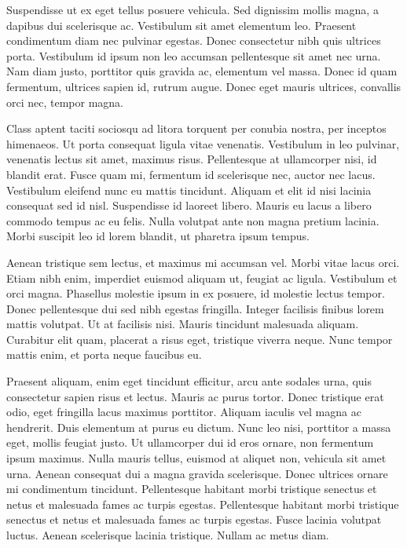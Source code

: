 Suspendisse ut ex eget tellus posuere vehicula. Sed dignissim mollis magna, a dapibus dui scelerisque ac. Vestibulum sit amet elementum leo. Praesent condimentum diam nec pulvinar egestas. Donec consectetur nibh quis ultrices porta. Vestibulum id ipsum non leo accumsan pellentesque sit amet nec urna. Nam diam justo, porttitor quis gravida ac, elementum vel massa. Donec id quam fermentum, ultrices sapien id, rutrum augue. Donec eget mauris ultrices, convallis orci nec, tempor magna.

Class aptent taciti sociosqu ad litora torquent per conubia nostra, per inceptos himenaeos. Ut porta consequat ligula vitae venenatis. Vestibulum in leo pulvinar, venenatis lectus sit amet, maximus risus. Pellentesque at ullamcorper nisi, id blandit erat. Fusce quam mi, fermentum id scelerisque nec, auctor nec lacus. Vestibulum eleifend nunc eu mattis tincidunt. Aliquam et elit id nisi lacinia consequat sed id nisl. Suspendisse id laoreet libero. Mauris eu lacus a libero commodo tempus ac eu felis. Nulla volutpat ante non magna pretium lacinia. Morbi suscipit leo id lorem blandit, ut pharetra ipsum tempus.

Aenean tristique sem lectus, et maximus mi accumsan vel. Morbi vitae lacus orci. Etiam nibh enim, imperdiet euismod aliquam ut, feugiat ac ligula. Vestibulum et orci magna. Phasellus molestie ipsum in ex posuere, id molestie lectus tempor. Donec pellentesque dui sed nibh egestas fringilla. Integer facilisis finibus lorem mattis volutpat. Ut at facilisis nisi. Mauris tincidunt malesuada aliquam. Curabitur elit quam, placerat a risus eget, tristique viverra neque. Nunc tempor mattis enim, et porta neque faucibus eu.

Praesent aliquam, enim eget tincidunt efficitur, arcu ante sodales urna, quis consectetur sapien risus et lectus. Mauris ac purus tortor. Donec tristique erat odio, eget fringilla lacus maximus porttitor. Aliquam iaculis vel magna ac hendrerit. Duis elementum at purus eu dictum. Nunc leo nisi, porttitor a massa eget, mollis feugiat justo. Ut ullamcorper dui id eros ornare, non fermentum ipsum maximus. Nulla mauris tellus, euismod at aliquet non, vehicula sit amet urna. Aenean consequat dui a magna gravida scelerisque. Donec ultrices ornare mi condimentum tincidunt. Pellentesque habitant morbi tristique senectus et netus et malesuada fames ac turpis egestas. Pellentesque habitant morbi tristique senectus et netus et malesuada fames ac turpis egestas. Fusce lacinia volutpat luctus. Aenean scelerisque lacinia tristique. Nullam ac metus diam.


